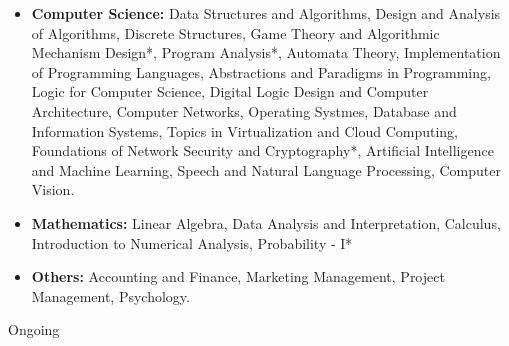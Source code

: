 \begin{itemize}[itemsep = -1.3 mm, leftmargin=*]
% 
\item {\bf Computer Science:} Data Structures and Algorithms, Design 
and Analysis of Algorithms, Discrete Structures, Game Theory and Algorithmic Mechanism Design*, Program Analysis*, Automata Theory, 
Implementation of Programming Languages, Abstractions and Paradigms in 
Programming, Logic for Computer Science, Digital Logic Design and Computer 
Architecture, Computer Networks, Operating Systmes, Database and 
Information Systems, Topics in Virtualization and Cloud Computing,
Foundations of Network Security and Cryptography*, Artificial 
Intelligence and Machine Learning, Speech and Natural Language Processing, Computer Vision.
    
    \item {\bf Mathematics:} Linear Algebra, Data Analysis and Interpretation, Calculus, Introduction to Numerical Analysis, Probability - I*
    \item {\bf Others:} Accounting and Finance, Marketing Management, Project Management, Psychology.
\end{itemize}
\vspace{-13pt}
\hfill * Ongoing